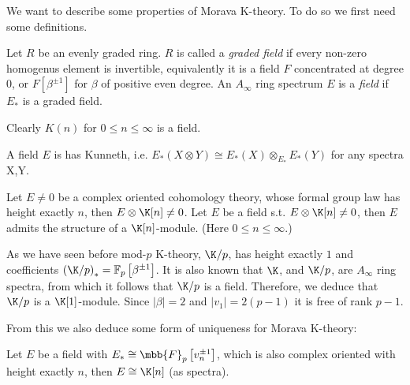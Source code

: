 We want to describe some properties of Morava K-theory.
To do so we first need some definitions.

\begin{definition}
	Let $R$ be an evenly graded ring.
	$R$ is called a \emph{graded field} if every non-zero homogenus element is invertible, equivalently it is a field $F$ concentrated at degree 0, or $F\left[\beta^{\pm1}\right]$ for $\beta$ of positive even degree.
	An $A_\infty$ ring spectrum $E$ is a \emph{field} if $E_*$ is a graded field.
\end{definition}

\begin{example*}
	Clearly $K\left(n\right)$ for $0 \leq n \leq \infty$ is a field.
\end{example*}

\begin{proposition}
	A field $E$ is has Kunneth, i.e. $E_*\left(X\otimes Y\right)\cong E_*\left(X\right)\otimes_{E_*}E_*\left(Y\right)$ for any spectra X,Y.
\end{proposition}

\begin{proposition}
	Let $E \neq 0$ be a complex oriented cohomology theory, whose formal group law has height exactly $n$, then $E \otimes \K[n] \neq 0$.
	Let $E$ be a field s.t. $E \otimes \K[n] \neq 0$, then $E$ admits the structure of a $\K[n]$-module.
	(Here $0 \leq n \leq \infty$.)
\end{proposition}

\begin{example*}
	As we have seen before mod-$p$ K-theory, $\K/p$, has height exactly $1$ and coefficients $\left(\K/p\right)_* = \mathbb{F}_p \left[\beta^{\pm 1}\right]$.
	It is also known that $\K$, and $\K/p$, are $A_\infty$ ring spectra, from which it follows that $\K/p$ is a field.
	Therefore, we deduce that $\K/p$ is a $\K[1]$-module.
	Since $\left|\beta\right| = 2$ and $\left|v_1\right| = 2\left(p-1\right)$ it is free of rank $p-1$.
\end{example*}

From this we also deduce some form of uniqueness for Morava K-theory:

\begin{corollary}
	Let $E$ be a field with $E_* \cong \mbb{F}_p\left[v_n^{\pm 1}\right]$, which is also complex oriented with height exactly $n$, then $E \cong \K[n]$ (as spectra).
\end{corollary}



